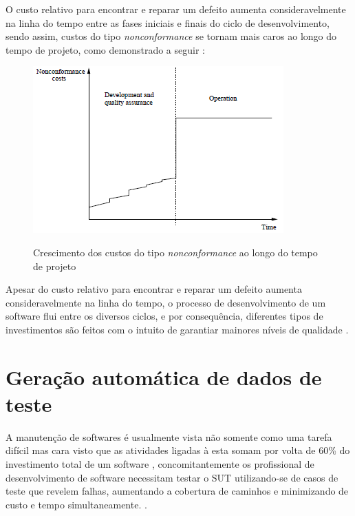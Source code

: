 \documentclass[
	12pt,				%
	oneside,			%
	a4paper,			%
	english,			%
	brazil				%
	]{abntex2ppgsi}
\begin{document}
 O custo relativo para encontrar e reparar um defeito aumenta consideravelmente na linha do tempo entre as fases iniciais e finais do ciclo de desenvolvimento, sendo assim, custos do tipo \textit{nonconformance} se tornam mais caros ao longo do tempo de projeto, como demonstrado a seguir \cite{wagner2005}:

\begin{figure}[H]%
	\centering
 	  \caption{Crescimento dos custos do tipo \textit{nonconformance} ao longo do tempo de projeto}
		\includegraphics{nonconformance-costs-timeline.png}
	\label{fig:framework-teste}
\end{figure}

Apesar do custo relativo para encontrar e reparar um defeito aumenta consideravelmente na linha do tempo, o processo de desenvolvimento de um software flui entre os diversos ciclos, e por consequência, diferentes tipos de investimentos são feitos com o intuito de garantiar mainores níveis de qualidade \cite{pressman2009engenharia}. 





\chapter{Geração automática de dados de teste}
\label{chap:geracao-automatica-dados-teste}
A manutenção de softwares é usualmente vista não somente como uma tarefa difícil mas cara visto que as atividades ligadas à esta somam por volta de 60\% do investimento total de um software \cite{shamshiri2018}, concomitantemente os profissional de desenvolvimento de software necessitam testar o SUT utilizando-se de casos de teste que revelem falhas, aumentando a cobertura de caminhos e minimizando de custo e tempo simultaneamente. \cite{dave2015}.
\end{document}
